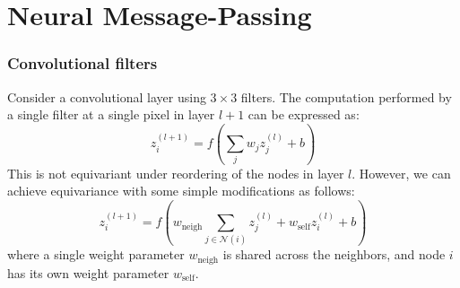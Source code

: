 \documentclass{beamer}
\begin{document}
\section{Neural Message-Passing}

\begin{frame}
    \frametitle{Convolutional filters}
    Consider a convolutional layer using $3\times{}3$ filters. The computation performed by a single filter at a single pixel in layer $l+1$ can be expressed as:
    \begin{equation*}
        z^{(l+1)}_{i}=f(\sum_{j}w_{j}z^{(l)}_{j}+b)
    \end{equation*}
    This is not equivariant under reordering of the nodes in layer $l$. However, we can achieve equivariance with some simple modifications as follows:
    \begin{equation*}
        z^{(l+1)}_{i}=f(w_{\textrm{neigh}}\sum_{j\in\mathcal{N}(i)}z^{(l)}_{j}+w_{\textrm{self}}z^{(l)}_{i}+b)
    \end{equation*}
    where a single weight parameter $w_{\textrm{neigh}}$ is shared across the neighbors, and node $i$ has its own weight parameter $w_{\textrm{self}}$.
\end{frame}
\end{document}
